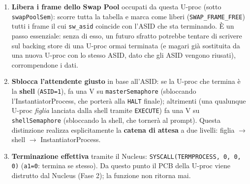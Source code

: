 \documentclass[11pt,a4paper]{article}
\newcommand{\code}[1]{\texttt{#1}}
\begin{document}
\begin{enumerate}
\item \textbf{Libera i frame dello Swap Pool} occupati da questa U-proc
  (sotto \code{swapPoolSem}): scorre tutta la tabella e marca come liberi
  (\code{SWAP\_FRAME\_FREE}) tutti i frame il cui \code{sw\_asid} coincide
  con l'ASID che sta terminando. \`E un passo essenziale: senza di esso, un
  futuro sfratto potrebbe tentare di scrivere sul backing store di una
  U-proc ormai terminata (e magari già sostituita da una nuova U-proc con
  lo stesso ASID, dato che gli ASID vengono riusati), corrompendone i dati.
\item \textbf{Sblocca l'attendente giusto} in base all'ASID: se la U-proc
  che termina è la \textbf{shell} (\code{ASID=1}), fa una V su
  \code{masterSemaphore} (sbloccando l'InstantiatorProcess, che porterà
  alla \code{HALT} finale); altrimenti (una qualunque U-proc \emph{figlia}
  lanciata dalla shell tramite \code{EXECUTE}) fa una V su
  \code{shellSemaphore} (sbloccando la shell, che tornerà al prompt). Questa
  distinzione realizza esplicitamente la \textbf{catena di attesa} a due
  livelli: figlia $\to$ shell $\to$ InstantiatorProcess.
\item \textbf{Terminazione effettiva} tramite il Nucleus:
  \code{SYSCALL(TERMPROCESS, 0, 0, 0)} (\code{a1=0}: termina se stesso). Da
  questo punto il PCB della U-proc viene distrutto dal Nucleus (Fase 2); la
  funzione non ritorna mai.
\end{enumerate}
\end{document}
